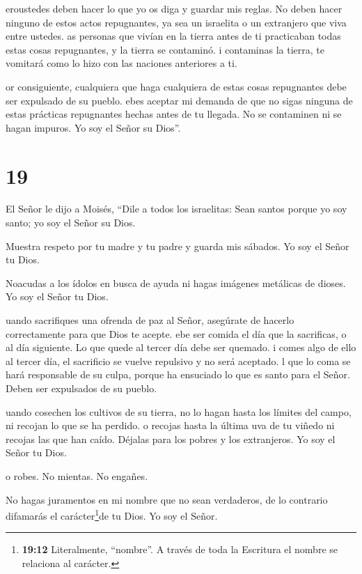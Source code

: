  eroustedes deben hacer lo que yo os diga y guardar mis
reglas. No deben hacer ninguno de estos actos repugnantes, ya sea un
israelita o un extranjero que viva entre ustedes.  as
personas que vivían en la tierra antes de ti practicaban todas estas
cosas repugnantes, y la tierra se contaminó.  i contaminas
la tierra, te vomitará como lo hizo con las naciones anteriores a ti.

 or consiguiente, cualquiera que haga cualquiera de estas
cosas repugnantes debe ser expulsado de su pueblo.  ebes
aceptar mi demanda de que no sigas ninguna de estas prácticas
repugnantes hechas antes de tu llegada. No se contaminen ni se hagan
impuros. Yo soy el Señor su Dios''.

\hypertarget{section-18}{%
\section{19}\label{section-18}}

 El Señor le dijo a Moisés,  ``Dile a todos los
israelitas: Sean santos porque yo soy santo; yo soy el Señor su Dios.

 Muestra respeto por tu madre y tu padre y guarda mis
sábados. Yo soy el Señor tu Dios.

 Noacudas a los ídolos en busca de ayuda ni hagas imágenes
metálicas de dioses. Yo soy el Señor tu Dios.

 uando sacrifiques una ofrenda de paz al Señor, asegúrate de
hacerlo correctamente para que Dios te acepte.  ebe ser
comida el día que la sacrificas, o al día siguiente. Lo que quede al
tercer día debe ser quemado.  i comes algo de ello al tercer
día, el sacrificio se vuelve repulsivo y no será aceptado. 
l que lo coma se hará responsable de su culpa, porque ha ensuciado lo
que es santo para el Señor. Deben ser expulsados de su pueblo.

 uando cosechen los cultivos de su tierra, no lo hagan hasta
los límites del campo, ni recojan lo que se ha perdido.  o
recojas hasta la última uva de tu viñedo ni recojas las que han caído.
Déjalas para los pobres y los extranjeros. Yo soy el Señor tu Dios.

 o robes. No mientas. No engañes.

 No hagas juramentos en mi nombre que no sean verdaderos,
de lo contrario difamarás el carácter\footnote{\textbf{19:12}
  Literalmente, ``nombre''. A través de toda la Escritura el nombre se
  relaciona al carácter.}de tu Dios. Yo soy el Señor.

